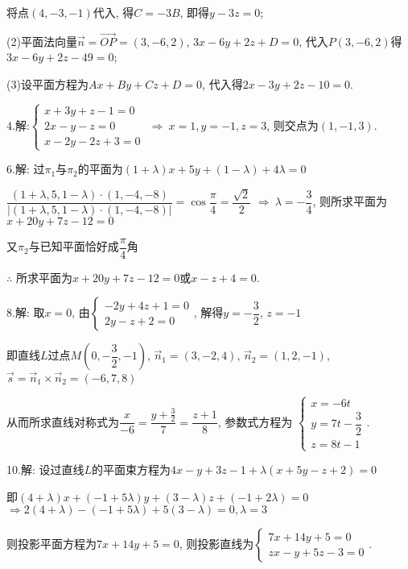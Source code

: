   将点$(4,-3,-1)$代入, 得$C=-3B$, 即得$y-3z=0$;

  (2)平面法向量$\overrightarrow n  = \overrightarrow {OP}  = (3, - 6,2)$, $3x-6y+2z+D=0$, 代入$P(3,-6,2)$得$3x-6y+2z-49=0$;

  (3)设平面方程为$Ax+By+Cz+D=0$, 代入得$2x-3y+2z-10=0$.

  4.解:$\begin{cases}
  x+3y+z-1=0\\
  2x-y-z=0\\
  x-2y-2z+3=0
  \end{cases}$
  $\Rightarrow~x=1,y=-1,z=3$, 则交点为$(1,-1,3)$.

  6.解: 过$\pi_1$与$\pi_2$的平面为$\left( 1+\lambda \right)x+5y+\left( 1-\lambda \right)+4\lambda = 0$

  $\dfrac{\left( 1+\lambda,5,1-\lambda \right) \cdot \left( 1,-4,-8 \right)}{\left| \left( 1+\lambda,5,1-\lambda \right) \cdot \left( 1,-4,-8 \right) \right|} = \cos\dfrac{\pi}{4} = \dfrac{\sqrt{2}}{2}$ $\Rightarrow~\lambda = -\dfrac{3}{4}$, 则所求平面为$x+20y+7z-12=0$

  又$\pi_2$与已知平面恰好成$\dfrac{\pi}{4}$角

  $\therefore$ 所求平面为$x+20y+7z-12=0$或$x-z+4=0$.

  8.解: 取$x=0$, 由$\begin{cases}
  -2y+4z+1=0\\
  2y-z+2=0
  \end{cases}$,
  解得$y=-\dfrac{3}{2}$, $z=-1$

  即直线$L$过点$M(0,-\dfrac{3}{2},-1)$,
  $\overrightarrow n_1  = (3, - 2,4)$, $\overrightarrow n_2  = (1, 2,-1)$,
  $\overrightarrow s  = \overrightarrow n_1  \times \overrightarrow n_2 =(-6,7,8)$

  从而所求直线对称式为$\dfrac{x}{{ - 6}} = \dfrac{{y + \frac{3}{2}}}{7} = \dfrac{{z + 1}}{8}$, 参数式方程为
  $\begin{cases}
    x=-6t \\
    y=7t-\dfrac{3}{2} \\
    z=8t-1
  \end{cases}$.

  10.解: 设过直线$L$的平面束方程为$4x-y+3z-1+\lambda (x+5y-z+2)=0$

  即$(4 + \lambda )x + ( - 1 + 5\lambda )y + (3 - \lambda )z + ( - 1 + 2\lambda ) = 0$
  $\Rightarrow 2(4 + \lambda ) - ( - 1 + 5\lambda ) + 5(3 - \lambda ) = 0 , \lambda  = 3$

  则投影平面方程为$7x+14y+5=0$,
  则投影直线为$\begin{cases}
  7x+14y+5=0\\
  zx-y+5z-3=0
  \end{cases}$.

